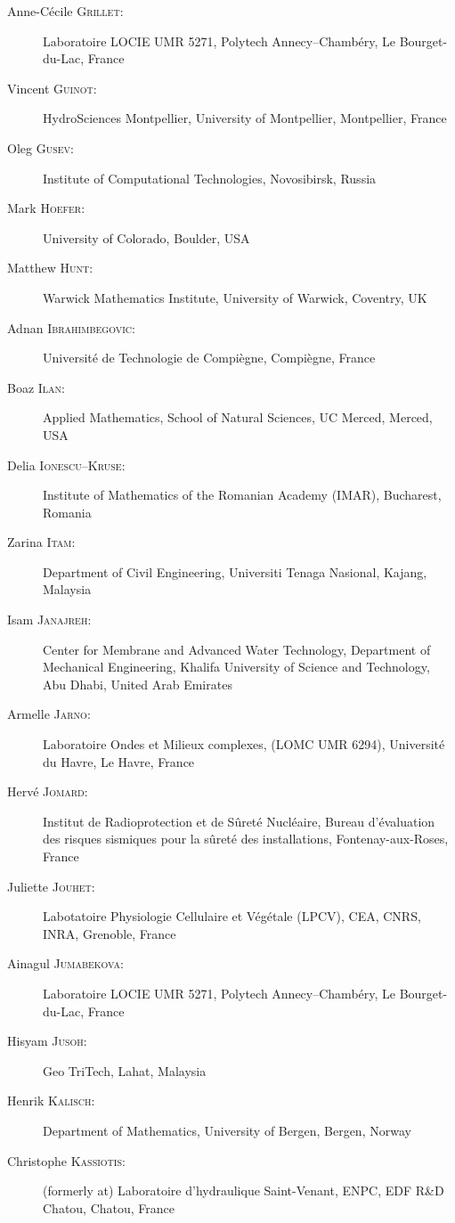 \begin{description}
  \item[Anne-C\'ecile \textsc{Grillet}:] Laboratoire LOCIE UMR 5271, Polytech Annecy--Chamb\'ery, Le Bourget-du-Lac, France
  \item[Vincent \textsc{Guinot}:] HydroSciences Montpellier, University of Montpellier, Montpellier, France
  \item[Oleg \textsc{Gusev}:] Institute of Computational Technologies, Novosibirsk, Russia
  \item[Mark \textsc{Hoefer}:] University of Colorado, Boulder, USA
  \item[Matthew \textsc{Hunt}:] Warwick Mathematics Institute, University of Warwick, Coventry, UK
  \item[Adnan \textsc{Ibrahimbegovic}:] Universit\'e de Technologie de Compi\`egne, Compi\`egne, France
  \item[Boaz \textsc{Ilan}:] Applied Mathematics, School of Natural Sciences, UC Merced, Merced, USA
  \item[Delia \textsc{Ionescu--Kruse}:] Institute of Mathematics of the Romanian Academy (IMAR), Bucharest, Romania
  \item[Zarina \textsc{Itam}:] Department of Civil Engineering, Universiti Tenaga Nasional, Kajang, Malaysia
  \item[Isam \textsc{Janajreh}:] Center for Membrane and Advanced Water Technology, Department of Mechanical Engineering, Khalifa University of Science and Technology, Abu Dhabi, United Arab Emirates
  \item[Armelle \textsc{Jarno}:] Laboratoire Ondes et Milieux complexes, (LOMC UMR 6294), Universit\'e du Havre, Le Havre, France
  \item[Herv\'e \textsc{Jomard}:] Institut de Radioprotection et de S\^uret\'e Nucl\'eaire, Bureau d'\'evaluation des risques sismiques pour la s\^uret\'e des installations, Fontenay-aux-Roses, France
  \item[Juliette \textsc{Jouhet}:] Labotatoire Physiologie Cellulaire et V\'eg\'etale (LPCV), CEA, CNRS, INRA, Grenoble, France
  \item[Ainagul \textsc{Jumabekova}:] Laboratoire LOCIE UMR 5271, Polytech Annecy--Chamb\'ery, Le Bourget-du-Lac, France
  \item[Hisyam \textsc{Jusoh}:] Geo TriTech, Lahat, Malaysia
  \item[Henrik \textsc{Kalisch}:] Department of Mathematics, University of Bergen, Bergen, Norway
  \item[Christophe \textsc{Kassiotis}:] (formerly at) Laboratoire d'hydraulique Saint-Venant, ENPC, EDF R\&D Chatou, Chatou, France

\end{description}
